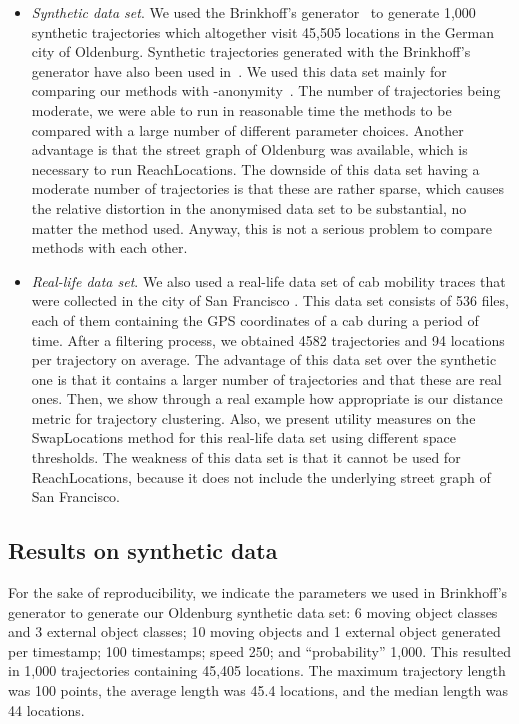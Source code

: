 \begin{itemize}
\item {\em Synthetic data set}.
We used the Brinkhoff's generator~\cite{brinkhoff03} to generate
1,000 synthetic trajectories which altogether visit
45,505 locations in the German city of
Oldenburg.
Synthetic trajectories generated with the Brinkhoff's generator have also
been used in~\cite{abul08,nergiz08,nergiz09,yarovoy09}.
We used this data set mainly for comparing
our methods with -anonymity~\cite{abul08}.
The number of trajectories
being moderate, we were able to run
in reasonable time the methods to be compared with a large
number of different parameter choices. Another advantage
is that the street graph of Oldenburg was available, which
is necessary to run ReachLocations. The downside of this data set having
a moderate number of trajectories is that these are rather sparse,
which causes the relative distortion in the anonymised data set to
be substantial, no matter the method used. Anyway, this is not
a serious problem to compare methods with each other.
\item {\em Real-life data set}.
We also used a real-life data set of cab mobility traces that were
collected in the city of San Francisco \cite{comsnets09piorkowski}.
This data set consists of 536 files, each of them containing
the GPS coordinates of a cab during a period of time.
After a filtering process, we obtained 4582 trajectories and 94
locations per trajectory on average. The advantage
of this data set over the synthetic one is that it
contains a larger number of trajectories and that these are real ones.
Then, we show through a real example how appropriate is our distance metric for trajectory clustering. Also, we present
utility measures on the SwapLocations method for this real-life data set
using different space thresholds. The weakness of this data set
is that it cannot be used for ReachLocations, because it does
not include the underlying street graph of San Francisco.
\end{itemize}


\subsection{Results on synthetic data}

For the sake of reproducibility, we indicate
the parameters we used in Brinkhoff's generator
to generate our Oldenburg synthetic data set: 6
moving object classes and 3 external object classes; 10 moving objects and
1 external object generated per timestamp; 100 timestamps; speed 250;
and ``probability'' 1,000. This resulted in 1,000 trajectories containing
45,405 locations. The maximum trajectory length was 100 points, the
average length was 45.4 locations, and the median length was 44 locations.

